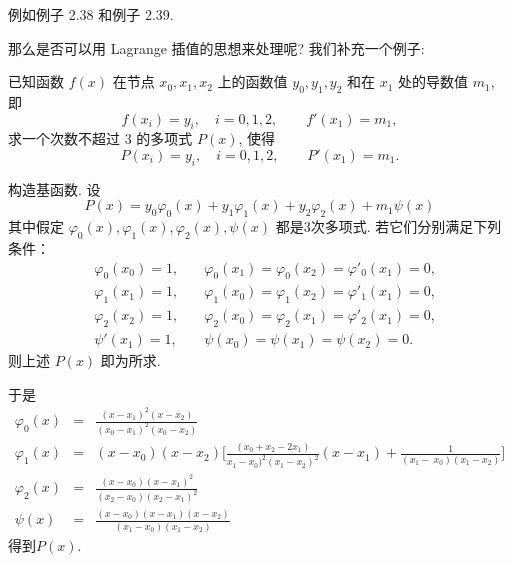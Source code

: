 \documentclass[a4paper]{ctexart}
\begin{document}
例如例子 2.38 和例子 2.39.

那么是否可以用 Lagrange 插值的思想来处理呢? 我们补充一个例子:

已知函数 $f(x)$ 在节点 $x_0, x_1, x_2$ 上的函数值 $y_0, y_1, y_2$ 和在 $x_1$ 处的导数值
$m_1$, 即                                                                           
$$
f(x_i) = y_i,\quad i = 0, 1, 2, \qquad f'(x_1) = m_1,
$$                                 
求一个次数不超过 $3$ 的多项式 $P(x)$, 使得                                            
$$
P(x_i) = y_i,\quad i = 0, 1, 2, \qquad P'(x_1) = m_1.
$$  

构造基函数. 设                                                                   
$$
P(x) = y_0 \varphi_0(x) + y_1 \varphi_1(x) + y_2 \varphi_2(x) + m_1 \psi(x)
$$                                 
其中假定 $\varphi_0(x), \varphi_1(x), \varphi_2(x), \psi(x)$ 都是3次多项式.
若它们分别满足下列条件：     
\begin{eqnarray}                                                                                    
&\varphi_0(x_0)=1, \quad &\varphi_0(x_1)=\varphi_0(x_2)=\varphi'_0(x_1)=0,\\             
&\varphi_1(x_1)=1,\quad &\varphi_1(x_0)=\varphi_1(x_2)=\varphi'_1(x_1)=0,\\             
&\varphi_2(x_2)=1,\quad &\varphi_2(x_0)=\varphi_2(x_1)=\varphi'_2(x_1)=0,\\             
&\psi'(x_1)=1,\quad &\psi(x_0)=\psi(x_1)=\psi(x_2)=0.                                   
\end{eqnarray}                                                                                      
则上述 $P(x)$ 即为所求.

于是                                                                                     
\begin{eqnarray*}                                                                                            
\varphi_0(x)&=&\frac{(x-x_1)^2(x-x_2)}{(x_0-x_1)^2(x_0-x_2)}\\                                       
\varphi_1(x)&=&(x-x_0)(x-x_2)\Big[\frac{(x_0+x_2-2x_1)}{x_1-x_0)^2(x_1-x_2)^2}(x-x_1)+\frac{1}{(x_1-\
x_0)(x_1-x_2)}\Big]\\                                                                               
\varphi_2(x)&=&\frac{(x-x_0)(x-x_1)^2}{(x_2-x_0)(x_2-x_1)^2}\\                                       
\psi(x)&=&\frac{(x-x_0)(x-x_1)(x-x_2)}{(x_1-x_0)(x_1-x_2)}                                           
\end{eqnarray*}                                                                                                  
得到$P(x)$.
\end{document}
